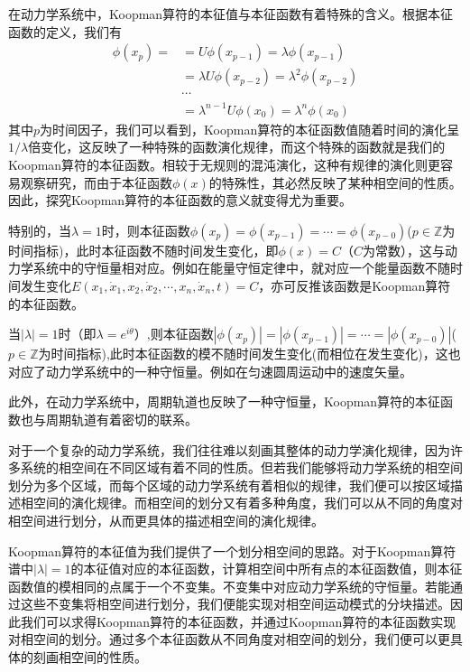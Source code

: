 在动力学系统中，Koopman算符的本征值与本征函数有着特殊的含义。根据本征函数的定义，我们有
\begin{equation}
    \begin{aligned}
        \phi(x_p)=  &=U\phi(x_{p-1})=\lambda\phi(x_{p-1})\\
                    &=\lambda U\phi(x_{p-2})=\lambda^2\phi(x_{p-2})\\
                    &\cdots\\
                    &=\lambda^{n-1}U\phi(x_0)=\lambda^n\phi(x_0)
    \end{aligned}
\end{equation}
其中$p$为时间因子，我们可以看到，Koopman算符的本征函数值随着时间的演化呈$1/\lambda$倍变化，这反映了一种特殊的函数演化规律，而这个特殊的函数就是我们的Koopman算符的本征函数。相较于无规则的混沌演化，这种有规律的演化则更容易观察研究，而由于本征函数$\phi(x)$的特殊性，其必然反映了某种相空间的性质。因此，探究Koopman算符的本征函数的意义就变得尤为重要。

特别的，当$\lambda=1$时，则本征函数$\phi(x_p)=\phi(x_{p-1})=\cdots=\phi(x_{p-0})$($p\in \mathbb{Z}$为时间指标)，此时本征函数不随时间发生变化，即$\phi(x)=C$（$C$为常数），这与动力学系统中的守恒量相对应。例如在能量守恒定律中，就对应一个能量函数不随时间发生变化$E(x_1,\dot{x}_1,x_2,\dot{x}_2,\cdots,x_n,\dot{x}_n,t)=C$，亦可反推该函数是Koopman算符的本征函数。

当$|\lambda|=1$时（即$\lambda=e^{i\theta}$）,则本征函数$|\phi(x_p)|=|\phi(x_{p-1})|=\cdots=|\phi(x_{p-0})|$($p\in \mathbb{Z}$为时间指标),此时本征函数的模不随时间发生变化(而相位在发生变化)，这也对应了动力学系统中的一种守恒量。例如在匀速圆周运动中的速度矢量。

此外，在动力学系统中，周期轨道也反映了一种守恒量，Koopman算符的本征函数也与周期轨道有着密切的联系。

对于一个复杂的动力学系统，我们往往难以刻画其整体的动力学演化规律，因为许多系统的相空间在不同区域有着不同的性质。但若我们能够将动力学系统的相空间划分为多个区域，而每个区域的动力学系统有着相似的规律，我们便可以按区域描述相空间的演化规律。而相空间的划分又有着多种角度，我们可以从不同的角度对相空间进行划分，从而更具体的描述相空间的演化规律。

Koopman算符的本征值为我们提供了一个划分相空间的思路。对于Koopman算符谱中$|\lambda|=1$的本征值对应的本征函数，计算相空间中所有点的本征函数值，则本征函数值的模相同的点属于一个不变集。不变集中对应动力学系统的守恒量。若能通过这些不变集将相空间进行划分，我们便能实现对相空间运动模式的分块描述。因此我们可以求得Koopman算符的本征函数，并通过Koopman算符的本征函数实现对相空间的划分。通过多个本征函数从不同角度对相空间的划分，我们便可以更具体的刻画相空间的性质。


